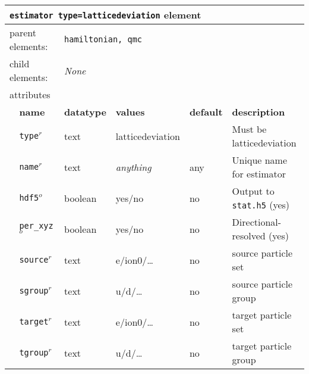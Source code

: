 \FloatBarrier
\begin{table}[h]
\begin{center}
\begin{tabularx}{\textwidth}{l l l l l l }
\hline
\multicolumn{6}{l}{\texttt{estimator type=latticedeviation} element} \\
\hline
\multicolumn{2}{l}{parent elements:} & \multicolumn{4}{l}{\texttt{hamiltonian, qmc}}\\
\multicolumn{2}{l}{child  elements:} & \multicolumn{4}{l}{\textit{None}}\\
\multicolumn{2}{l}{attributes}  & \multicolumn{4}{l}{}\\
   & \bfseries name       & \bfseries datatype & \bfseries values  & \bfseries default   & \bfseries description \\
   & \texttt{type}$^r$    &  text              & latticedeviation      &                     & Must be latticedeviation       \\
   & \texttt{name}$^r$    &  text              & \textit{anything} & any                 & Unique name for estimator \\
   & \texttt{hdf5}$^o$    &  boolean           & yes/no            & no                  & Output to \texttt{stat.h5} (yes) \\
   & \texttt{per\_xyz}$^o$    &  boolean           & yes/no            & no                  & Directional-resolved (yes) \\
   & \texttt{source}$^r$    &  text           & e/ion0/\dots         & no                  & source particle set \\
   & \texttt{sgroup}$^r$    &  text           & u/d/\dots         & no                  & source particle group \\
   & \texttt{target}$^r$    &  text           & e/ion0/\dots         & no                  & target particle set \\
   & \texttt{tgroup}$^r$    &  text           & u/d/\dots         & no                  & target particle group \\
  \hline
\end{tabularx}
\end{center}
\end{table}
\FloatBarrier

